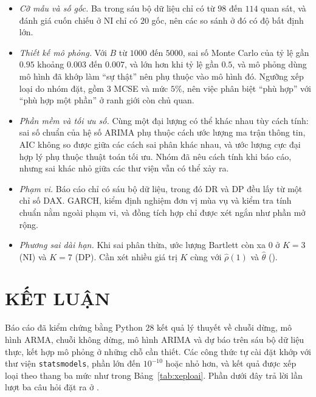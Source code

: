 \begin{itemize}[leftmargin=*,itemsep=2pt]
\item \emph{Cỡ mẫu và số gốc.} Ba trong sáu bộ dữ liệu chỉ có từ $98$ đến $114$ quan sát, và đánh giá cuốn chiếu ở NI chỉ có $20$ gốc, nên các so sánh ở đó có độ bất định lớn.
\item \emph{Thiết kế mô phỏng.} Với $B$ từ $1000$ đến $5000$, sai số Monte Carlo của tỷ lệ gần $0.95$ khoảng $0.003$ đến $0.007$, và lớn hơn khi tỷ lệ gần $0.5$, và mô phỏng dùng mô hình đã khớp làm ``sự thật'' nên phụ thuộc vào mô hình đó. Ngưỡng xếp loại do nhóm đặt, gồm $3$ MCSE và mức $5\%$, nên việc phân biệt ``phù hợp'' với ``phù hợp một phần'' ở ranh giới còn chủ quan.
\item \emph{Phần mềm và tối ưu số.} Cùng một đại lượng có thể khác nhau tùy cách tính: sai số chuẩn của hệ số ARIMA phụ thuộc cách ước lượng ma trận thông tin, AIC không so được giữa các cách sai phân khác nhau, và ước lượng cực đại hợp lý phụ thuộc thuật toán tối ưu. Nhóm đã nêu cách tính khi báo cáo, nhưng sai khác nhỏ giữa các thư viện vẫn có thể xảy ra.
\item \emph{Phạm vi.} Báo cáo chỉ có sáu bộ dữ liệu, trong đó DR và DP đều lấy từ một chỉ số DAX. GARCH, kiểm định nghiệm đơn vị mùa vụ và kiểm tra tính chuẩn nằm ngoài phạm vi, và đồng tích hợp chỉ được xét ngắn như phần mở rộng.
\item \emph{Phương sai dài hạn.} Khi sai phân thừa, ước lượng Bartlett còn xa $0$ ở $K=3$ (NI) và $K=7$ (DP). Cần xét nhiều giá trị $K$ cùng với $\hat\rho(1)$ và $\hat\theta$ ().
\end{itemize}
\clearpage
\section[Kết luận]{KẾT LUẬN}

Báo cáo đã kiểm chứng bằng Python $28$ kết quả lý thuyết về chuỗi dừng, mô hình ARMA, chuỗi không dừng, mô hình ARIMA và dự báo trên sáu bộ dữ liệu thực, kết hợp mô phỏng ở những chỗ cần thiết. Các công thức tự cài đặt khớp với thư viện \texttt{statsmodels}, phần lớn đến $10^{-10}$ hoặc nhỏ hơn, và kết quả được xếp loại theo thang ba mức như trong Bảng~\ref{tab:xeploai}. Phần dưới đây trả lời lần lượt ba câu hỏi đặt ra ở .

